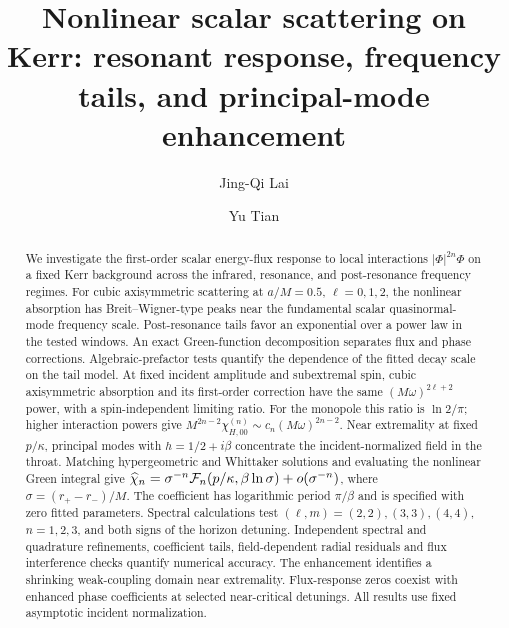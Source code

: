 \documentclass[aps,prd,twocolumn,10pt,nofootinbib,superscriptaddress,floatfix]{revtex4-2}
\begin{document}
\title{Nonlinear scalar scattering on Kerr: resonant response, frequency tails, and principal-mode enhancement}
\author{Jing-Qi Lai}
\author{Yu Tian}

\begin{abstract}
We investigate the first-order scalar energy-flux response to local
interactions $|\Phi|^{2n}\Phi$ on a fixed Kerr background across the infrared,
resonance, and post-resonance frequency regimes.
For cubic axisymmetric scattering at $a/M=0.5$, $\ell=0,1,2$, the nonlinear
absorption has Breit--Wigner-type peaks near the fundamental scalar
quasinormal-mode frequency scale.  Post-resonance tails favor an
exponential over a power law in the tested windows.  An exact Green-function
decomposition separates flux and phase corrections.  Algebraic-prefactor tests
quantify the dependence of the fitted decay scale on the tail model.
At fixed incident amplitude and subextremal spin, cubic axisymmetric
absorption and its first-order correction have the same
$(M\omega)^{2\ell+2}$ power, with a spin-independent limiting ratio.
For the monopole this ratio is $\ln2/\pi$; higher interaction powers give
$M^{2n-2}\chi_{H,00}^{(n)}\sim c_n(M\omega)^{2n-2}$.
Near extremality at fixed $p/\kappa$, principal modes with
$h=1/2+i\beta$ concentrate the incident-normalized field in the throat.
Matching hypergeometric and Whittaker solutions and evaluating the
nonlinear Green integral give
$\widehat\chi_n=\sigma^{-n}{\cal F}_n(p/\kappa,\beta\ln\sigma)
+o(\sigma^{-n})$, where $\sigma=(r_+-r_-)/M$.
The coefficient has logarithmic period $\pi/\beta$ and is specified with
zero fitted parameters.  Spectral calculations test $(\ell,m)=(2,2),(3,3),(4,4)$,
$n=1,2,3$, and both signs of the horizon detuning.  Independent spectral
and quadrature refinements, coefficient tails, field-dependent radial
residuals and flux interference checks quantify numerical accuracy.
The enhancement identifies a shrinking weak-coupling domain near extremality.
Flux-response zeros coexist with enhanced phase coefficients at selected
near-critical detunings.
All results use fixed asymptotic incident normalization.
\end{abstract}
\end{document}
